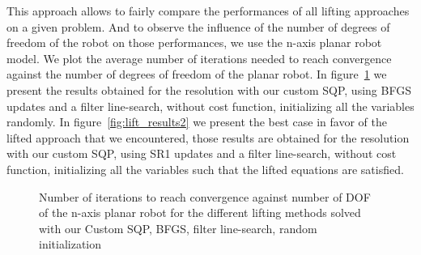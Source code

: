 This approach allows to fairly compare the performances of all lifting approaches on a given problem.
And to observe the influence of the number of degrees of freedom of the robot on those performances, we use the n-axis planar robot model.
We plot the average number of iterations needed to reach convergence against the number of degrees of freedom of the planar robot.
In figure~\ref{fig:lift_results} we present the results obtained for the resolution with our custom SQP, using BFGS updates and a filter line-search, without cost function, initializing all the variables randomly.
In figure~\ref{fig:lift_results2} we present the best case in favor of the lifted approach that we encountered, those results are obtained for the resolution with our custom SQP, using SR1 updates and a filter line-search, without cost function, initializing all the variables such that the lifted equations are satisfied.

\begin{figure}
\centering
{}
\caption{Number of iterations to reach convergence against number of DOF of the n-axis planar robot for the different lifting methods solved with our Custom SQP, BFGS, filter line-search, random initialization}%
\label{fig:lift_results}
\end{figure}


